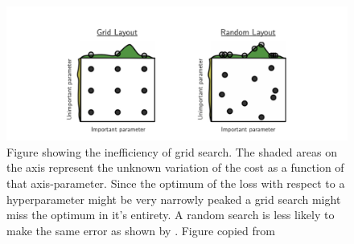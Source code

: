\begin{figure}[H]
\centering
\hspace*{-1.3in}\includegraphics{../figures/randomsearch.png}
\caption[Why randomsearch works]{Figure showing the inefficiency of grid search. The shaded areas on the axis represent the unknown variation of the cost as a function of that axis-parameter. Since the optimum of the loss with respect to a hyperparameter might be very narrowly peaked a grid search might miss the optimum in it's entirety. A random search is less likely to make the same error as shown by \citet{Bergstra2012}. Figure copied from \citet{Bergstra2012}}\label{fig:randomsearch}
\end{figure} 
